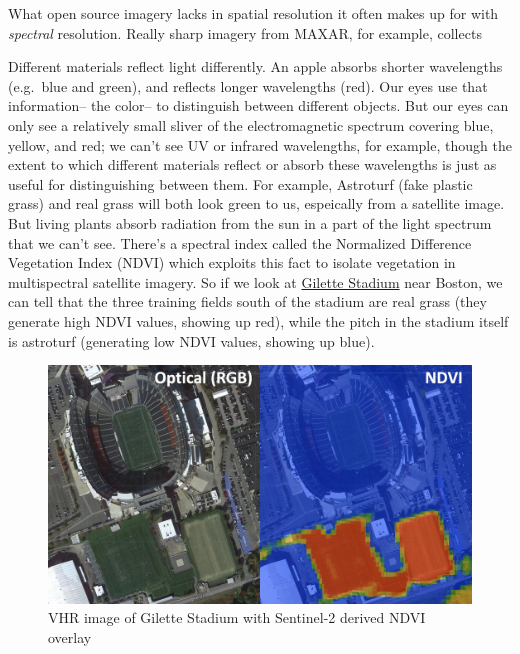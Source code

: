 \documentclass[
  letterpaper,
  DIV=11,
  numbers=noendperiod]{scrreprt}
\begin{document}
What open source imagery lacks in spatial resolution it often makes up
for with \emph{spectral} resolution. Really sharp imagery from MAXAR,
for example, collects

Different materials reflect light differently. An apple absorbs shorter
wavelengths (e.g.~blue and green), and reflects longer wavelengths
(red). Our eyes use that information-- the color-- to distinguish
between different objects. But our eyes can only see a relatively small
sliver of the electromagnetic spectrum covering blue, yellow, and red;
we can't see UV or infrared wavelengths, for example, though the extent
to which different materials reflect or absorb these wavelengths is just
as useful for distinguishing between them. For example, Astroturf (fake
plastic grass) and real grass will both look green to us, espeically
from a satellite image. But living plants absorb radiation from the sun
in a part of the light spectrum that we can't see. There's a spectral
index called the Normalized Difference Vegetation Index (NDVI) which
exploits this fact to isolate vegetation in multispectral satellite
imagery. So if we look at
\href{https://en.wikipedia.org/wiki/Gillette_Stadium}{Gilette Stadium}
near Boston, we can tell that the three training fields south of the
stadium are real grass (they generate high NDVI values, showing up red),
while the pitch in the stadium itself is astroturf (generating low NDVI
values, showing up blue).

\begin{figure}

{\centering \includegraphics{./images/NDVI.jpg}

}

\caption{VHR image of Gilette Stadium with Sentinel-2 derived NDVI
overlay}

\end{figure}
\end{document}
